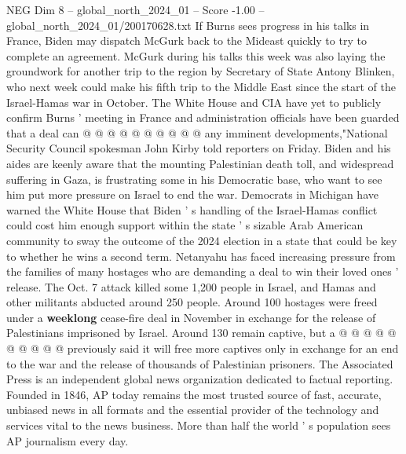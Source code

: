 \begin{textsample}{NEG Dim 8 – global\_north\_2024\_01 – Score -1.00 – global\_north\_2024\_01/200170628.txt}
If Burns sees progress in his talks in France, Biden may dispatch McGurk back to the Mideast quickly to try to complete an agreement.
McGurk during his talks this week was also laying the groundwork for another trip to the region by Secretary of State Antony Blinken, who next week could make his fifth trip to the Middle East since the start of the Israel-Hamas war in October.
The White House and CIA have yet to publicly confirm Burns ' meeting in France and administration officials have been guarded that a deal can @ @ @ @ @ @ @ @ @ @ any imminent developments,"National Security Council spokesman John Kirby told reporters on Friday.
Biden and his aides are keenly aware that the mounting Palestinian death toll, and widespread suffering in Gaza, is frustrating some in his Democratic base, who want to see him put more pressure on Israel to end the war.
Democrats in Michigan have warned the White House that Biden ' s handling of the Israel-Hamas conflict could cost him enough support within the state ' s sizable Arab American community to sway the outcome of the 2024 election in a state that could be key to whether he wins a second term.
Netanyahu has faced increasing pressure from the families of many hostages who are demanding a deal to win their loved ones ' release.
The Oct. 7 attack killed some 1,200 people in Israel, and Hamas and other militants abducted around 250 people.
Around 100 hostages were freed under a \textbf{weeklong} cease-fire deal in November in exchange for the release of Palestinians imprisoned by Israel.
Around 130 remain captive, but a @ @ @ @ @ @ @ @ @ @ previously said it will free more captives only in exchange for an end to the war and the release of thousands of Palestinian prisoners.
The Associated Press is an independent global news organization dedicated to factual reporting.
Founded in 1846, AP today remains the most trusted source of fast, accurate, unbiased news in all formats and the essential provider of the technology and services vital to the news business.
More than half the world ' s population sees AP journalism every day.

\end{textsample}
